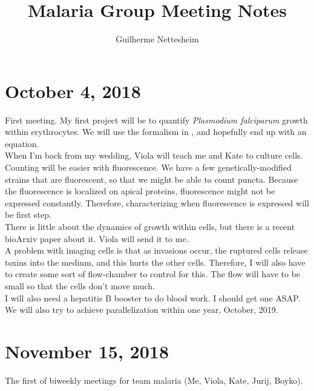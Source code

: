 \documentclass{article}
\author{Guilherme Nettesheim}
\title{Malaria Group Meeting Notes}
\date{}
\begin{document}
\maketitle

\section{October 4, 2018}

First meeting. My first project will be to quantify \emph{Plasmodium falciparum} growth within erythrocytes. We will use the formalism in \cite{Kennard2016}, and hopefully end up with an equation.\\

When I'm back from my wedding, Viola will teach me and Kate to culture cells.\\

Counting will be easier with fluorescence. We have a few genetically-modified strains that are fluorescent, so that we might be able to count puncta. Because the fluorescence is localized on apical proteins, fluorescence might not be expressed constantly. Therefore, characterizing when fluorescence is expressed will be first step.\\

There is little about the dynamics of growth within cells, but there is a recent bioArxiv paper about it. Viola will send it to me.\\

A problem with imaging cells is that as invasions occur, the ruptured cells release toxins into the medium, and this hurts the other cells. Therefore, I will also have to create some sort of flow-chamber to control for this. The flow will have to be small so that the cells don't move much.\\

I will also need a hepatitis B booster to do blood work. I should get one ASAP.\\

We will also try to achieve parallelization within one year, October, 2019.\\

\section{November 15, 2018}

The first of biweekly meetings for team malaria (Me, Viola, Kate, Jurij, Boyko).\\
\end{document}
